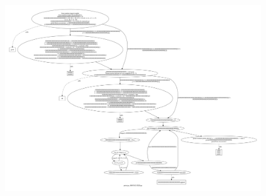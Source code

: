 \documentclass[a4paper,oneside,openright,titlepage,10pt,footinclude,headinclude]{scrbook}
\begin{document}
\begin{figure}[!h]
        \centering
        \includegraphics[height=24cm, width=15cm, keepaspectratio]{img/primi_OBFUSCATED.png}
\end{figure}



\end{document}
